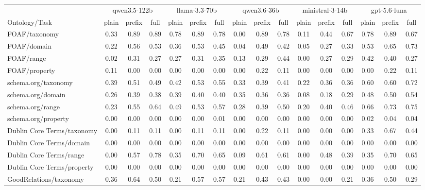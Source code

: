 \begin{tabular}{lccccccccccccccc}
\toprule
 & \multicolumn{3}{c}{qwen3.5-122b} & \multicolumn{3}{c}{llama-3.3-70b} & \multicolumn{3}{c}{qwen3.6-36b} & \multicolumn{3}{c}{ministral-3-14b} & \multicolumn{3}{c}{gpt-5.6-luna} \\
\cmidrule(lr){2-4} \cmidrule(lr){5-7} \cmidrule(lr){8-10} \cmidrule(lr){11-13} \cmidrule(lr){14-16}
Ontology/Task & plain & prefix & full & plain & prefix & full & plain & prefix & full & plain & prefix & full & plain & prefix & full \\
\midrule
FOAF/taxonomy & 0.33 & 0.89 & 0.89 & 0.78 & 0.89 & 0.78 & 0.00 & 0.89 & 0.78 & 0.11 & 0.44 & 0.67 & 0.78 & 0.89 & 0.67 \\
FOAF/domain & 0.22 & 0.56 & 0.53 & 0.36 & 0.53 & 0.45 & 0.04 & 0.49 & 0.42 & 0.05 & 0.27 & 0.33 & 0.53 & 0.65 & 0.73 \\
FOAF/range & 0.02 & 0.31 & 0.27 & 0.27 & 0.31 & 0.35 & 0.13 & 0.29 & 0.44 & 0.00 & 0.27 & 0.29 & 0.42 & 0.40 & 0.27 \\
FOAF/property & 0.11 & 0.00 & 0.00 & 0.00 & 0.00 & 0.00 & 0.00 & 0.22 & 0.11 & 0.00 & 0.00 & 0.00 & 0.00 & 0.22 & 0.11 \\
schema.org/taxonomy & 0.39 & 0.51 & 0.49 & 0.42 & 0.53 & 0.55 & 0.33 & 0.39 & 0.41 & 0.22 & 0.36 & 0.36 & 0.60 & 0.60 & 0.72 \\
schema.org/domain & 0.26 & 0.39 & 0.38 & 0.39 & 0.40 & 0.40 & 0.35 & 0.36 & 0.36 & 0.08 & 0.18 & 0.29 & 0.48 & 0.50 & 0.54 \\
schema.org/range & 0.23 & 0.55 & 0.64 & 0.49 & 0.53 & 0.57 & 0.28 & 0.39 & 0.50 & 0.20 & 0.40 & 0.46 & 0.66 & 0.73 & 0.75 \\
schema.org/property & 0.00 & 0.00 & 0.00 & 0.00 & 0.00 & 0.01 & 0.00 & 0.00 & 0.00 & 0.00 & 0.00 & 0.00 & 0.02 & 0.04 & 0.04 \\
Dublin Core Terms/taxonomy & 0.00 & 0.11 & 0.11 & 0.00 & 0.11 & 0.11 & 0.00 & 0.22 & 0.11 & 0.00 & 0.00 & 0.00 & 0.33 & 0.67 & 0.44 \\
Dublin Core Terms/domain & 0.00 & 0.00 & 0.00 & 0.00 & 0.00 & 0.00 & 0.00 & 0.00 & 0.00 & 0.00 & 0.00 & 0.00 & 0.00 & 0.00 & 0.00 \\
Dublin Core Terms/range & 0.00 & 0.57 & 0.78 & 0.35 & 0.70 & 0.65 & 0.09 & 0.61 & 0.61 & 0.00 & 0.48 & 0.39 & 0.35 & 0.70 & 0.65 \\
Dublin Core Terms/property & 0.00 & 0.00 & 0.00 & 0.00 & 0.00 & 0.00 & 0.00 & 0.00 & 0.00 & 0.00 & 0.00 & 0.00 & 0.00 & 0.00 & 0.00 \\
GoodRelations/taxonomy & 0.36 & 0.64 & 0.50 & 0.21 & 0.57 & 0.57 & 0.21 & 0.43 & 0.43 & 0.00 & 0.00 & 0.21 & 0.36 & 0.50 & 0.29 \\

\end{tabular}
